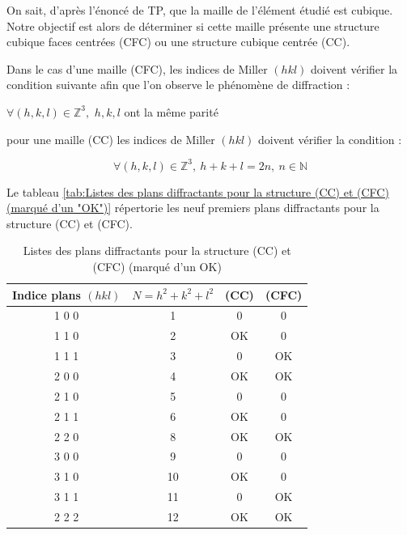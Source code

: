 \begin{flushleft}
	On sait, d'après l'énoncé de  TP, que la maille de l'élément étudié est cubique. Notre objectif est alors de déterminer si cette maille présente une structure cubique faces centrées (CFC) ou une structure cubique centrée (CC).
	
	
	Dans le cas d’une maille (CFC), les indices de Miller $(h k l)$ doivent vérifier la condition
	suivante afin que l’on observe le phénomène de diffraction : 
	\begin{center} 
		$\forall (h,k,l)\in \mathbb{Z}^3,$  $h,k,l$ ont la même parité 
	\end{center}
	
	pour une  maille (CC) les indices de Miller $(h k l)$ doivent vérifier la condition : 
	
	\begin{equation}
		\forall (h,k,l)\in \mathbb{Z}^3, \ 	h + k + l = 2n, \ n \in \mathbb{N}
	\end{equation}


\newpage
Le tableau \ref{tab:Listes des plans diffractants pour la structure (CC) et (CFC) (marqué d’un "OK")} répertorie les neuf premiers plans diffractants pour la structure (CC) et (CFC).
\begin{table}[h!]
	\centering
	\begin{tabular}{|c|c|c|c|}
		\hline
		\textbf{Indice plans $(h k l)$} & \textbf{$N=h^2+k^2+l^2$} & \textbf{(CC)} & \textbf{(CFC)} \\
		\hline
		1 0 0 & 1 & 0 & 0 \\
		\hline
		1 1 0 & 2 & \textcolor{myred}{OK }& 0 \\
		\hline
		1 1 1 & 3 & 0 & \textcolor{myred}{OK } \\
		\hline
		2 0 0 & 4 & \textcolor{myred}{OK } & \textcolor{myred}{OK } \\
		\hline
		2 1 0 & 5 & 0 & 0 \\
		\hline
		2 1 1 & 6 & \textcolor{myred}{OK } & 0 \\
		\hline
		2 2 0 & 8 & \textcolor{myred}{OK } & \textcolor{myred}{OK } \\
		\hline
		3 0 0 & 9 & 0 & 0 \\
		\hline
		3 1 0 & 10 & \textcolor{myred}{OK } & 0 \\
		\hline
		3 1 1 & 11 & 0 & \textcolor{myred}{OK } \\
		\hline
		2 2 2 & 12 & \textcolor{myred}{OK } & \textcolor{myred}{OK } \\
		\hline
	\end{tabular}
	\caption{Listes des plans diffractants pour la structure (CC) et (CFC) (marqué d’un \textcolor{myred}{OK})}
	\label{tab:Listes des plans diffractants pour la structure (CC) et (CFC) marqué d’un "OK"}
\end{table}



\end{flushleft}
